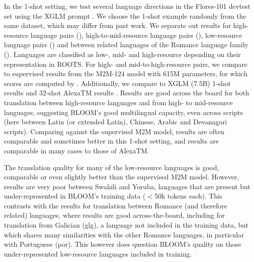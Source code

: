 In the 1-shot setting, we test several language directions in the Flores-101 \citep{goyal-etal-2022-flores} devtest set using the XGLM prompt \citep{lin2021xglm}.%
We choose the 1-shot example randomly from the same dataset, which may differ from past work.
We separate out results for high-resource language pairs (), high-to-mid-resource language pairs (), low-resource language pairs () and between related languages of the Romance language family ().%
 Languages are classified as low-, mid- and high-resource depending on their representation in ROOTS.
For high- and mid-to-high-resource pairs, we compare to supervised results from the M2M-124 model \citep{fan-etal-2021-beyond} with 615M parameters, for which scores are computed by \cite{goyal-etal-2022-flores}. Additionally, we compare to XGLM (7.5B) 1-shot results \citep{lin2021xglm} and 32-shot AlexaTM results \citep{soltan-etal-2022-alexatm}. %
%
Results are good across the board for both translation between high-resource languages and from high- to mid-resource languages, suggesting BLOOM's good multilingual capacity, even across scripts (here between Latin (or extended Latin), Chinese, Arabic and Devanagari scripts). Comparing against the supervised M2M model, results are often comparable and sometimes better in this 1-shot setting, and results are comparable in many cases to those of AlexaTM.

The translation quality for many of the low-resource languages is good, comparable or even slightly better than the supervised M2M model.
However, results are very poor between Swahili and Yoruba, languages that are present but under-represented in BLOOM's training data ($<$50k tokens each). This contrasts with the results for translation between Romance (and therefore related) languages, where results are good across-the-board, including for translation from Galician (glg), a language not included in the training data, but which shares many similarities with the other Romance languages, in particular with Portuguese (por). This however does question BLOOM's quality on those under-represented low-resource languages included in training.

